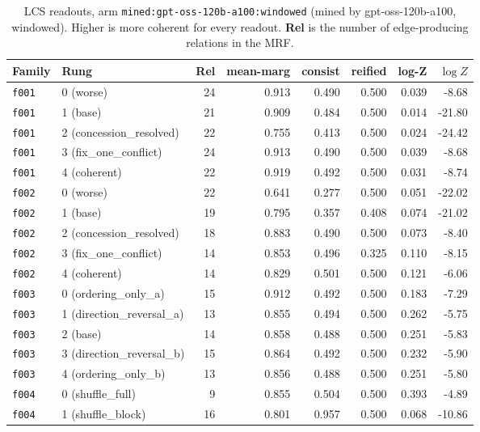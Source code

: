 \documentclass[11pt]{article}
\begin{document}
\begin{table}[htbp]
\centering
\small
\caption{LCS readouts, arm \texttt{mined:gpt-oss-120b-a100:windowed} (mined by gpt-oss-120b-a100, windowed). Higher is more coherent for every readout. \textbf{Rel} is the number of edge-producing relations in the MRF.}
\label{tab:scores-mined-gpt-oss-120b-a100-windowed}
\begin{tabular}{llrrrrrr}
\toprule
Family & Rung & Rel & \textbf{mean-marg} & \textbf{consist} & \textbf{reified} & \textbf{log-Z} & $\log Z$ \\
\midrule
\texttt{f001} & 0 (worse) & 24 & 0.913 & 0.490 & 0.500 & 0.039 & -8.68 \\
\texttt{f001} & 1 (base) & 21 & 0.909 & 0.484 & 0.500 & 0.014 & -21.80 \\
\texttt{f001} & 2 (concession\_resolved) & 22 & 0.755 & 0.413 & 0.500 & 0.024 & -24.42 \\
\texttt{f001} & 3 (fix\_one\_conflict) & 24 & 0.913 & 0.490 & 0.500 & 0.039 & -8.68 \\
\texttt{f001} & 4 (coherent) & 22 & 0.919 & 0.492 & 0.500 & 0.031 & -8.74 \\
\midrule
\texttt{f002} & 0 (worse) & 22 & 0.641 & 0.277 & 0.500 & 0.051 & -22.02 \\
\texttt{f002} & 1 (base) & 19 & 0.795 & 0.357 & 0.408 & 0.074 & -21.02 \\
\texttt{f002} & 2 (concession\_resolved) & 18 & 0.883 & 0.490 & 0.500 & 0.073 & -8.40 \\
\texttt{f002} & 3 (fix\_one\_conflict) & 14 & 0.853 & 0.496 & 0.325 & 0.110 & -8.15 \\
\texttt{f002} & 4 (coherent) & 14 & 0.829 & 0.501 & 0.500 & 0.121 & -6.06 \\
\midrule
\texttt{f003} & 0 (ordering\_only\_a) & 15 & 0.912 & 0.492 & 0.500 & 0.183 & -7.29 \\
\texttt{f003} & 1 (direction\_reversal\_a) & 13 & 0.855 & 0.494 & 0.500 & 0.262 & -5.75 \\
\texttt{f003} & 2 (base) & 14 & 0.858 & 0.488 & 0.500 & 0.251 & -5.83 \\
\texttt{f003} & 3 (direction\_reversal\_b) & 15 & 0.864 & 0.492 & 0.500 & 0.232 & -5.90 \\
\texttt{f003} & 4 (ordering\_only\_b) & 13 & 0.856 & 0.488 & 0.500 & 0.251 & -5.80 \\
\midrule
\texttt{f004} & 0 (shuffle\_full) & 9 & 0.855 & 0.504 & 0.500 & 0.393 & -4.89 \\
\texttt{f004} & 1 (shuffle\_block) & 16 & 0.801 & 0.957 & 0.500 & 0.068 & -10.86 \\

\end{tabular}
\end{table}
\end{document}
